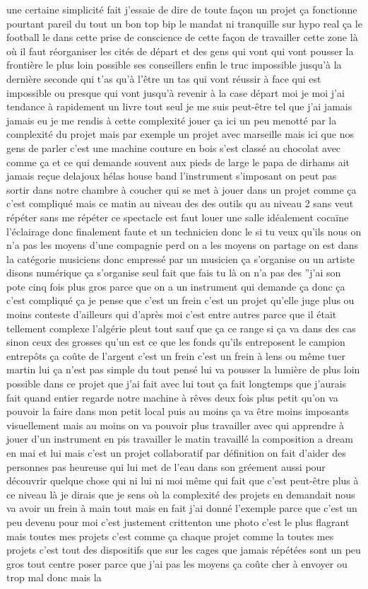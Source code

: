 une certaine simplicité fait j'essaie de dire de toute façon un projet ça fonctionne pourtant pareil du tout un bon top bip le mandat ni tranquille sur hypo real ça le football le dans cette prise de conscience de cette façon de travailler cette zone là où il faut réorganiser les cités de départ et des gens qui vont qui vont pousser la frontière le plus loin possible ses conseillers enfin le truc impossible jusqu'à la dernière seconde qui t'as qu'à l'être un tas qui vont réussir à face qui est impossible ou presque qui vont jusqu'à revenir à la case départ moi je moi j'ai tendance à rapidement un livre tout seul je me suis peut-être tel que j'ai jamais jamais eu je me rendis à cette complexité jouer ça ici un peu menotté par la complexité du projet mais par exemple un projet avec marseille mais ici que nos gens de parler c'est une machine couture en bois s'est classé au chocolat avec comme ça et ce qui demande souvent aux pieds de large le papa de dirhams ait jamais reçue delajoux hélas house band l'instrument s'imposant on peut pas sortir dans notre chambre à coucher qui se met à jouer dans un projet comme ça c'est compliqué mais ce matin au niveau des des outils qu au niveau 2 sans veut répéter sans me répéter ce spectacle est faut louer une salle idéalement cocaïne l'éclairage donc finalement faute et un technicien donc le si tu veux qu'ils nous on n'a pas les moyens d'une compagnie perd on a les moyens on partage on est dans la catégorie musiciens donc empressé par un musicien ça s'organise ou un artiste disons numérique ça s'organise seul fait que fais tu là on n'a pas des ''j'ai son pote cinq fois plus gros parce que on a un instrument qui demande ça donc ça c'est compliqué ça je pense que c'est un frein c'est un projet qu'elle juge plus ou moins conteste d'ailleurs qui d'après moi c'est entre autres parce que il était tellement complexe l'algérie pleut tout sauf que ça ce range si ça va dans des cas sinon ceux des grosses qu'un est ce que les fonds qu'ils entreposent le campion entrepôts ça coûte de l'argent c'est un frein c'est un frein à lens ou même tuer martin lui ça n'est pas simple du tout pensé lui va pousser la lumière de plus loin possible dans ce projet que j'ai fait avec lui tout ça fait longtemps que j'aurais fait quand entier regarde notre machine à rêves deux fois plus petit qu'on va pouvoir la faire dans mon petit local puis au moins ça va être moins imposants visuellement mais au moins on va pouvoir plus travailler avec qui apprendre à jouer d'un instrument en pis travailler le matin travaillé la composition a dream en mai et lui mais c'est un projet collaboratif par définition on fait d'aider des personnes pas heureuse qui lui met de l'eau dans son gréement aussi pour découvrir quelque chose qui ni lui ni moi même qui fait que c'est peut-être plus à ce niveau là je dirais que je sens où la complexité des projets en demandait nous va avoir un frein à main tout mais en fait j'ai donné l'exemple parce que c'est un peu devenu pour moi c'est justement crittenton une photo c'est le plus flagrant mais toutes mes projets c'est comme ça chaque projet comme la toutes mes projets c'est tout des dispositifs que sur les cages que jamais répétées sont un peu gros tout centre poser parce que j'ai pas les moyens ça coûte cher à envoyer ou trop mal donc mais la 